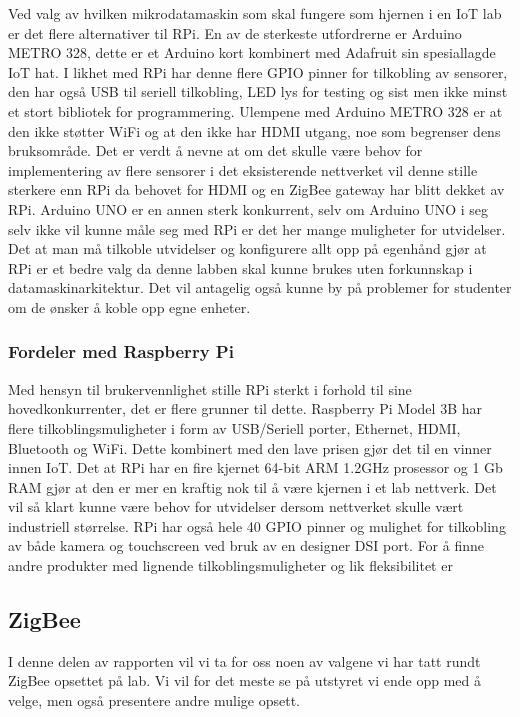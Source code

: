 \documentclass{article}
\begin{document}
Ved valg av hvilken mikrodatamaskin som skal fungere som hjernen i en IoT lab er det flere alternativer til RPi. En av de sterkeste utfordrerne er Arduino METRO 328, dette er et Arduino kort kombinert med Adafruit sin spesiallagde IoT hat. I likhet med RPi har denne flere GPIO pinner for tilkobling av sensorer, den har også USB til seriell tilkobling, LED lys for testing og sist men ikke minst et stort bibliotek for programmering. Ulempene med Arduino METRO 328 er at den ikke støtter WiFi og at den ikke har HDMI utgang, noe som begrenser dens bruksområde. Det er verdt å nevne at om det skulle være behov for implementering av flere sensorer i det eksisterende nettverket vil denne stille sterkere enn RPi da behovet for HDMI og en ZigBee gateway har blitt dekket av RPi. Arduino UNO er en annen sterk konkurrent, selv om Arduino UNO i seg selv ikke vil kunne måle seg med RPi er det her mange muligheter for utvidelser. Det at man må tilkoble utvidelser og konfigurere allt opp på egenhånd gjør at RPi er et bedre valg da denne labben skal kunne brukes uten forkunnskap i datamaskinarkitektur. Det vil antagelig også kunne by på problemer for studenter om de ønsker å koble opp egne enheter.

\subsubsection{Fordeler med Raspberry Pi}

Med hensyn til brukervennlighet stille RPi sterkt i forhold til sine hovedkonkurrenter, det er flere grunner til dette. Raspberry Pi Model 3B har flere tilkoblingsmuligheter i form av USB/Seriell porter, Ethernet, HDMI, Bluetooth og WiFi. Dette kombinert med den lave prisen gjør det til en vinner innen IoT. Det at RPi har en fire kjernet 64-bit ARM 1.2GHz prosessor og 1 Gb RAM gjør at den er mer en kraftig nok til å være kjernen i et lab nettverk. Det vil så klart kunne være behov for utvidelser dersom nettverket skulle vært industriell størrelse. RPi har også hele 40 GPIO pinner og mulighet for tilkobling av både kamera og touchscreen ved bruk av en designer DSI port. For å finne andre produkter med lignende tilkoblingsmuligheter og lik fleksibilitet er 


\subsection{ZigBee}
I denne delen av rapporten vil vi ta for oss noen av valgene vi har tatt rundt ZigBee opsettet på lab. Vi vil for det meste se på utstyret vi ende opp med å velge, men også presentere andre mulige opsett. 
\end{document}
